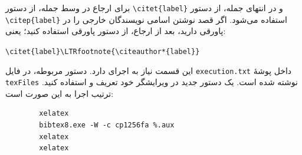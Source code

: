 برای ارجاع در وسط جمله، از دستور
\verb|\citet{label}|
و در انتهای جمله، از دستور
\verb|\citep{label}|
استفاده می‌شود. اگر قصد نوشتن اسامی نویسندگان خارجی را در پاورقی دارید،
بعد از ارجاع، از دستور پاورقی استفاده کنید؛ یعنی:
\begin{latin}\noindent
	\verb|\citet{label}\LTRfootnote{\citeauthor*{label}}|
\end{latin}

این قسمت نیاز به اجرای
دارد. دستور مربوطه، در فایل
\verb|execution.txt|
داخل پوشهٔ
\verb|texFiles|
نوشته شده است. یک دستور جدید در ویرایشگر خود تعریف و استفاده کنید. ترتیب اجرا به این صورت است:
\begin{latin}
	\begin{verbatim}
		xelatex
		bibtex8.exe -W -c cp1256fa %.aux
		xelatex
		xelatex
	\end{verbatim}
\end{latin}